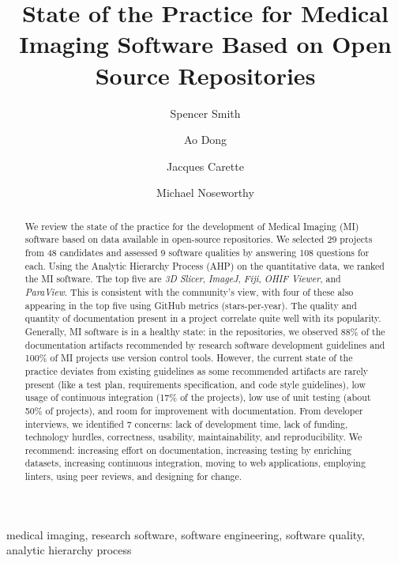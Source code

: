 \documentclass[draft, 12pt, 3p, times]{elsarticle} %
\begin{document}
\begin{frontmatter}

\title{State of the Practice for Medical Imaging Software Based on Open Source
Repositories}

\author[CAS]{Spencer Smith}
\author[CAS]{Ao Dong}
\author[CAS]{Jacques Carette}
\author[ECE]{Michael Noseworthy}



\begin{abstract}

We review the state of the practice for the development of Medical Imaging (MI)
software based on data available in open-source repositories. We selected 29
projects from 48 candidates and assessed 9 software qualities by answering 108
questions for each. Using the Analytic Hierarchy Process (AHP) on the
quantitative data, we ranked the MI software.  The top five are \textit{3D
Slicer}, \textit{ImageJ}, \textit{Fiji}, \textit{OHIF Viewer}, and
\textit{ParaView}.  This is consistent with the community's view, with four of
these also appearing in the top five using GitHub metrics (stars-per-year).  The
quality and quantity of documentation present in a project correlate quite well
with its popularity.  Generally, MI software is in a healthy state: in the
repositories, we observed 88\% of the documentation artifacts recommended by
research software development guidelines and 100\% of MI projects use version
control tools. However, the current state of the practice
deviates from existing guidelines as some recommended artifacts are rarely
present (like a test plan, requirements specification, and code
style guidelines), low usage of continuous integration (17\% of the projects),
low use of unit testing (about 50\% of projects), and room for improvement with
documentation. From developer interviews, we identified 7 concerns: lack of
development time, lack of funding, technology hurdles, correctness, usability,
maintainability, and reproducibility. We recommend: increasing effort on
documentation, increasing testing by enriching datasets, increasing continuous
integration, moving to web applications, employing linters, using peer reviews,
and designing for change.

\end{abstract}

\begin{keyword}
    medical imaging, research software, software engineering, software
    quality, analytic hierarchy process
\end{keyword}

\end{frontmatter}
\end{document}
